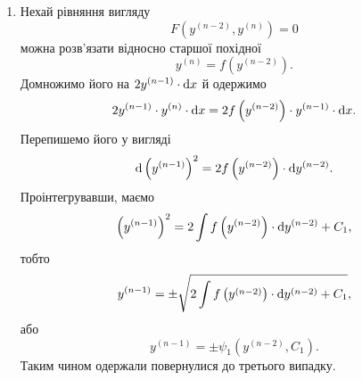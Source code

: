 \begin{enumerate}
\item Нехай рівняння вигляду
\begin{equation*}
	F \left( y^{(n-2)}, y^{(n)} \right) = 0
\end{equation*}
можна розв'язати відносно старшої похідної
\begin{equation*}
	y^{(n)} = f \left( y^{(n-2)} \right).
\end{equation*}
Домножимо його на $2 y^{(n-1)} \cdot \mathop{}\!\mathrm{d} x$ й одержимо
\begin{equation*}
	2 y^{(n-1)} \cdot y^{(n)} \cdot \mathop{}\!\mathrm{d} x= 2 f \left( y^{(n-2)} \right) \cdot y^{(n-1)} \cdot \mathop{}\!\mathrm{d} x.
\end{equation*}
Перепишемо його у вигляді
\begin{equation*}
	\mathop{}\!\mathrm{d} \left( y^{(n-1)} \right)^2 = 2 f \left( y^{(n-2)} \right) \cdot \mathop{}\!\mathrm{d} y^{(n-2)}.
\end{equation*}
Проінтегрувавши, маємо
\begin{equation*}
	\left( y^{(n-1)} \right)^2 = 2 \int f \left( y^{(n-2)} \right) \cdot \mathop{}\!\mathrm{d} y^{(n-2)} + C_1,
\end{equation*}
тобто 
\begin{equation*}
	y^{(n-1)}  = \pm \sqrt{2 \int f \left( y^{(n-2)} \right) \cdot \mathop{}\!\mathrm{d} y^{(n-2)} + C_1},
\end{equation*}
або
\begin{equation*}
	y^{(n-1)}  = \pm \psi_1 \left( y^{(n-2)}, C_1 \right).
\end{equation*}
Таким чином одержали повернулися до третього випадку.

\end{enumerate}